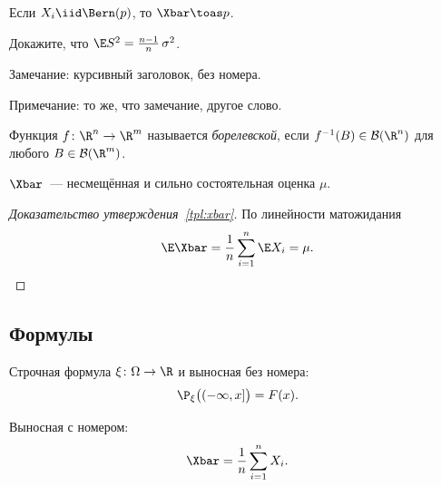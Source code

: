 \begin{example}
  Если $X_i \iid \Bern(p)$, то $\Xbar \toas p$.
\end{example}

\begin{exercise}
  Докажите, что $\E S^2 = \frac{n-1}{n}\,\sigma^2$.
\end{exercise}


\begin{remark}
  Замечание: курсивный заголовок, без номера.
\end{remark}

\begin{note}
  Примечание: то же, что замечание, другое слово.
\end{note}


\begin{reminder}
  Функция $f \colon \R^n \to \R^m$ называется \emph{борелевской}, если
  $f^{-1}(B) \in \mathcal{B}(\R^n)$ для любого $B \in \mathcal{B}(\R^m)$.
\end{reminder}

\begin{keybox}[Итог]
  $\Xbar$~--- несмещённая и сильно состоятельная оценка $\mu$.
\end{keybox}

\begin{proof}[Доказательство утверждения~\ref{tpl:xbar}]
  По линейности матожидания
  \[
    \E \Xbar = \frac1n \sum_{i=1}^n \E X_i = \mu. \qedhere
  \]
\end{proof}

\subsection{Формулы}

Строчная формула $\xi \colon \Omega \to \R$ и выносная без номера:
\[
  \P_\xi\bigl((-\infty, x]\bigr) = F(x).
\]

Выносная с номером:
\begin{equation}
  \label{tpl:eq:mean}
  \Xbar = \frac{1}{n} \sum_{i=1}^{n} X_i.
\end{equation}

